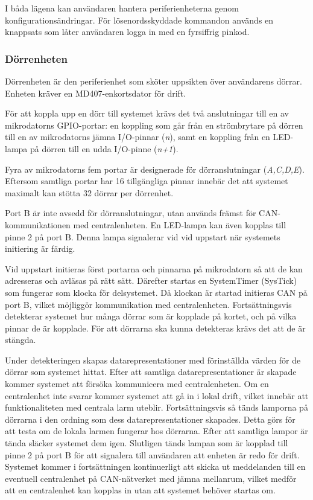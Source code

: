 \documentclass{article}
\begin{document}
I båda lägena kan användaren hantera periferienheterna genom konfigurationsändringar. För lösenordsskyddade kommandon används en knappsats som låter användaren logga in med en fyrsiffrig pinkod.


\subsubsection{Dörrenheten}
\label{subsec:Dörrenheten}

Dörrenheten är den periferienhet som sköter uppsikten över användarens dörrar. Enheten kräver en MD407-enkortsdator för drift.

För att koppla upp en dörr till systemet krävs det två anslutningar till en av mikrodatorns GPIO-portar: en koppling som går från en strömbrytare på dörren till en av mikrodatorns jämna I/O-pinnar (\textit{n}), samt en koppling från en LED-lampa på dörren till en udda I/O-pinne (\textit{n+1}).

Fyra av mikrodatorns fem portar är designerade för dörranslutningar (\textit{A,C,D,E}). \\
Eftersom samtliga portar har 16 tillgängliga pinnar innebär det att systemet maximalt kan stötta 32 dörrar per dörrenhet.

Port B är inte avsedd för dörranslutningar, utan används främst för CAN-\\kommunikationen
med centralenheten. En LED-lampa kan även kopplas till \\ pinne 2 på port B. Denna lampa signalerar vid vid uppstart när systemets initiering är färdig.

Vid uppstart initieras först portarna och pinnarna på mikrodatorn så att de kan adresseras
och avläsas på rätt sätt. Därefter startas en SystemTimer (SysTick) som fungerar som klocka för delsystemet.
Då klockan är startad initieras CAN på port B, vilket möjliggör kommunikation med centralenheten. Fortsättningsvis detekterar systemet hur många dörrar som är kopplade på kortet, och på vilka pinnar de är kopplade. För att dörrarna ska kunna detekteras krävs det att de är stängda.

Under detekteringen skapas datarepresentationer med förinställda värden för de dörrar som systemet
hittat. Efter att samtliga datarepresentationer är skapade kommer systemet att försöka kommunicera med centralenheten. Om en centralenhet inte svarar kommer systemet att gå in i lokal drift, vilket innebär att funktionaliteten med centrala larm uteblir.
Fortsättningsvis så tänds lamporna på dörrarna i den ordning som dess datarepresentationer skapades. Detta görs för att testa om de lokala larmen fungerar hos dörrarna. Efter att samtliga lampor är tända släcker systemet dem igen.
Slutligen tänds lampan som är kopplad till pinne 2 på port B för att signalera till användaren att enheten är redo för drift. Systemet kommer i fortsättningen kontinuerligt att skicka ut meddelanden till en eventuell centralenhet på CAN-nätverket med jämna mellanrum, vilket medför att en centralenhet kan kopplas in utan att systemet behöver startas om.
\end{document}
